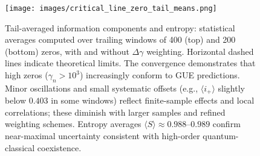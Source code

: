 \documentclass[12pt]{article}
\theoremstyle{plain}
\theoremstyle{definition}
\begin{document}
\begin{figure}[H]
\centering
\texttt{[image: images/critical\_line\_zero\_tail\_means.png]}
\caption{Tail-averaged information components and entropy: statistical averages computed over trailing windows of 400 (top) and 200 (bottom) zeros, with and without $\Delta\gamma$ weighting. Horizontal dashed lines indicate theoretical limits. The convergence demonstrates that high zeros ($\gamma_n > 10^3$) increasingly conform to GUE predictions. Minor oscillations and small systematic offsets (e.g., $\langle i_+ \rangle$ slightly below $0.403$ in some windows) reflect finite-sample effects and local correlations; these diminish with larger samples and refined weighting schemes. Entropy averages $\langle S \rangle \approx 0.988$--$0.989$ confirm near-maximal uncertainty consistent with high-order quantum-classical coexistence.}
\label{fig:tail_means}
\end{figure}
\end{document}
